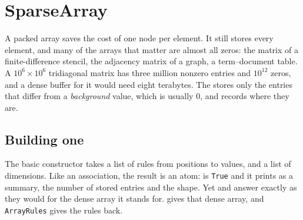 \section{SparseArray}
\label{sec:ds-sparse}

A packed array saves the cost of one node per element. It still stores every element,
and many of the arrays that matter are almost all zeros: the matrix of a finite-difference
stencil, the adjacency matrix of a graph, a term--document table. A
\(10^6\times10^6\) tridiagonal matrix has three million nonzero entries and
\(10^{12}\) zeros, and a dense buffer for it would need eight terabytes. The
 stores only the entries that differ from a
\emph{background} value, which is usually \(0\), and
records where they are.

\subsection{Building one}
\label{ssec:ds-sparse-build}

The basic constructor takes a list of rules from positions to values, and a list of
dimensions. Like an association, the result is an atom:  is
\texttt{True} and it prints as a summary, the number of stored entries and the shape.
Yet  and  answer exactly as they would for the dense
array it stands for.  gives that dense array, and \texttt{ArrayRules} gives the
rules back.

\begin{codepairs}
\end{codepairs}

